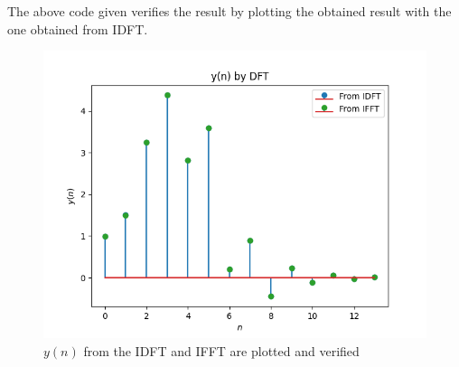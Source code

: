 \documentclass[journal,12pt,twocolumn]{IEEEtran}
\theoremstyle{remark}
\begin{document}
\begin{enumerate}[label=\thesection.\arabic*]
The above code given verifies the result by plotting the obtained result with the one obtained from IDFT.
\begin{figure}[H]
    \centering
    \includegraphics[width=\columnwidth]{figs/5_4.png}
    \caption{$y(n)$ from the IDFT and IFFT are plotted and verified}
    \label{fig:5.4_plot}
\end{figure}


\end{enumerate}
\end{document}

